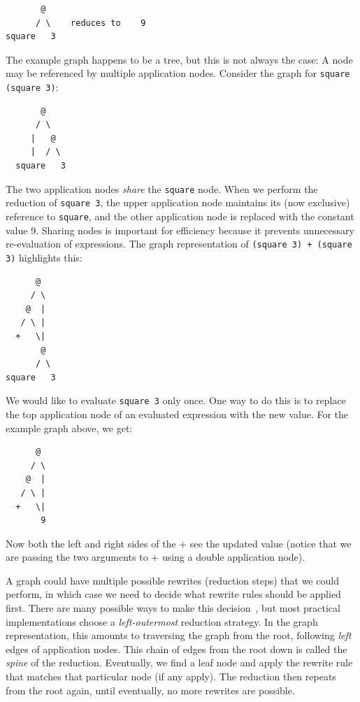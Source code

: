 \documentclass[conference]{IEEEtran}
\begin{document}
\begin{verbatim}
       @
      / \    reduces to    9
square   3
\end{verbatim}

The example graph happens to be a tree, but this is not always the case: A node may be referenced by multiple application nodes.
Consider the graph for \texttt{square (square 3)}:

\begin{verbatim}
       @
      / \
     |   @
     |  / \
  square   3
\end{verbatim}

The two application nodes \emph{share} the \texttt{square} node.
When we perform the reduction of \texttt{square 3}, the upper application node maintains its (now exclusive) reference to \texttt{square}, and the other application node is replaced with the constant value 9.
Sharing nodes is important for efficiency because it prevents unnecessary re-evaluation of expressions.
The graph representation of \texttt{(square 3) + (square 3)} highlights this:

\begin{verbatim}
      @ 
     / \
    @  |
   / \ |
  +   \|
       @
      / \
square   3
\end{verbatim}

We would like to evaluate \texttt{square 3} only once.
One way to do this is to replace the top application node of an evaluated expression with the new value.
For the example graph above, we get:

\begin{verbatim}
      @ 
     / \
    @  |
   / \ |
  +   \|
       9
\end{verbatim}

Now both the left and right sides of the + see the updated value (notice that we are passing the two arguments to + using a double application node).

A graph could have multiple possible rewrites (reduction steps) that we could perform, in which case we need to decide what rewrite rules should be applied first.
There are many possible ways to make this decision~\cite{spj_impl}, but most practical implementations choose a \emph{left-outermost} reduction strategy.
In the graph representation, this amounts to traversing the graph from the root, following \emph{left} edges of application nodes.
This chain of edges from the root down is called the \emph{spine} of the reduction.
Eventually, we find a leaf node and apply the rewrite rule that matches that particular node (if any apply).
The reduction then repeats from the root again, until eventually, no more rewrites are possible.
\end{document}
